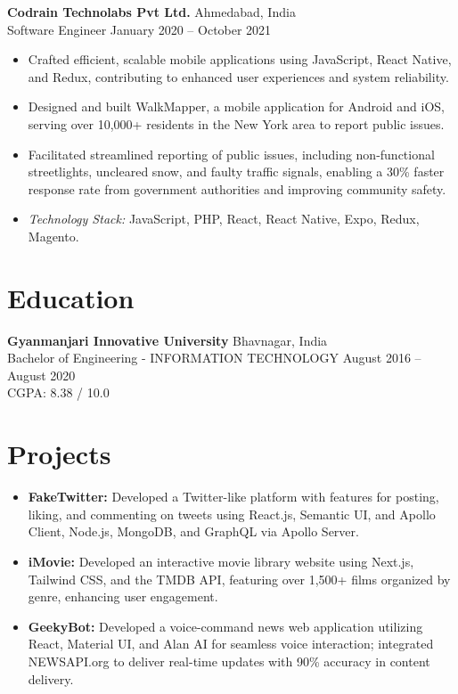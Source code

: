 \documentclass[letterpaper,10pt]{article}
\begin{document}
\textbf{Codrain Technolabs Pvt Ltd.} \hfill Ahmedabad, India \\
Software Engineer \hfill January 2020 – October 2021
\begin{itemize}
    \item Crafted efficient, scalable mobile applications using JavaScript, React Native, and Redux, contributing to enhanced user experiences and system reliability.
    \item Designed and built WalkMapper, a mobile application for Android and iOS, serving over 10,000+ residents in the New York area to report public issues.
    \item Facilitated streamlined reporting of public issues, including non-functional streetlights, uncleared snow, and faulty traffic signals, enabling a 30\% faster response rate from government authorities and improving community safety.
    \item \textit{Technology Stack:} JavaScript, PHP, React, React Native, Expo, Redux, Magento.
\end{itemize}

\section*{Education}
\textbf{Gyanmanjari Innovative University} \hfill Bhavnagar, India \\
Bachelor of Engineering - INFORMATION TECHNOLOGY \hfill August 2016 – August 2020 \\
CGPA: 8.38 / 10.0

\section*{Projects}
\begin{itemize}
    \item \textbf{FakeTwitter:} Developed a Twitter-like platform with features for posting, liking, and commenting on tweets using React.js, Semantic UI, and Apollo Client, Node.js, MongoDB, and GraphQL via Apollo Server.
    \item \textbf{iMovie:} Developed an interactive movie library website using Next.js, Tailwind CSS, and the TMDB API, featuring over 1,500+ films organized by genre, enhancing user engagement.
    \item \textbf{GeekyBot:} Developed a voice-command news web application utilizing React, Material UI, and Alan AI for seamless voice interaction; integrated NEWSAPI.org to deliver real-time updates with 90\% accuracy in content delivery.
\end{itemize}
\end{document}
